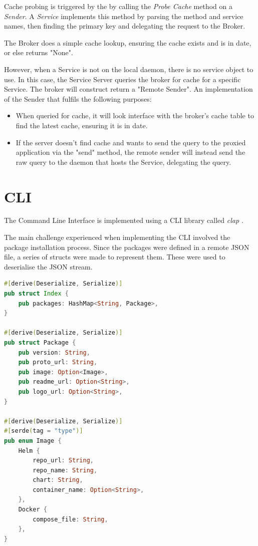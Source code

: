 \documentclass[a4paper,12pt]{report}
\begin{document}
Cache probing is triggered by the  by calling the \textit{Probe Cache} method on a \textit{Sender}.
A \textit{Service} implements this method by parsing the method and service names, then finding the primary key and delegating the request to the Broker.

The Broker does a simple cache lookup, ensuring the cache exists and is in date, or else returns "None".

However, when a Service is not on the local daemon, there is no service object to use. In this case, the Service Server queries the broker for cache for a specific Service. The broker will construct return a "Remote Sender". An implementation of the Sender that fulfils the following purposes:

\begin{itemize}
    \item When queried for cache, it will look interface with the broker's cache table to find the latest cache, ensuring it is in date.
    \item If the server doesn't find cache and wants to send the query to the proxied application via the "send" method, the remote sender will instead send the raw query to the daemon that hosts the Service, delegating the query.
\end{itemize}

\section{CLI}
The Command Line Interface is implemented using a CLI library called \textit{clap \cite{clap}}.

The main challenge experienced when implementing the CLI involved the package installation process.
Since the packages were defined in a remote JSON file, a series of structs were made to represent them. These were used to deserialise the JSON stream.

\begin{lstlisting}[language=Rust]
#[derive(Deserialize, Serialize)]
pub struct Index {
    pub packages: HashMap<String, Package>,
}

#[derive(Deserialize, Serialize)]
pub struct Package {
    pub version: String,
    pub proto_url: String,
    pub image: Option<Image>,
    pub readme_url: Option<String>,
    pub logo_url: Option<String>,
}

#[derive(Deserialize, Serialize)]
#[serde(tag = "type")]
pub enum Image {
    Helm {
        repo_url: String,
        repo_name: String,
        chart: String,
        container_name: Option<String>,
    },
    Docker {
        compose_file: String,
    },
}
\end{lstlisting}
\end{document}
